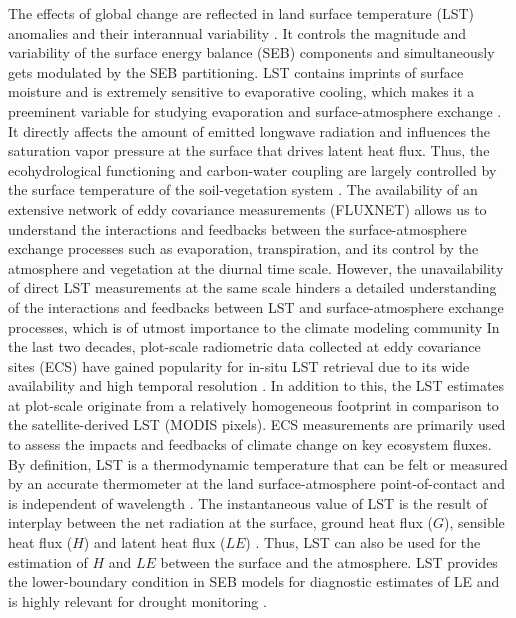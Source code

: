 \documentclass[fleqn,10pt]{wlscirep}
\begin{document}
The effects of global change are reflected in land surface temperature (LST) anomalies and their interannual variability \cite{rowell2005scenario}. It controls the magnitude and variability of the surface energy balance (SEB) components and simultaneously gets modulated by the SEB partitioning\cite{mallick2015reintroducing,timmermans2007intercomparison}. LST contains imprints of surface moisture and is extremely sensitive to evaporative cooling, which makes it a preeminent variable for studying evaporation and surface-atmosphere exchange \cite{mallick2018critical,trebs2021role,kustas2009advances}. It directly affects the amount of emitted longwave radiation and influences the saturation vapor pressure at the surface that drives latent heat flux. Thus, the ecohydrological functioning and carbon-water coupling are largely controlled by the surface temperature of the soil-vegetation system \cite{still2021imaging}.
 The availability of an extensive network of eddy covariance measurements (FLUXNET) allows us to understand the interactions and feedbacks between the surface-atmosphere exchange processes such as evaporation, transpiration, and its control by the atmosphere and vegetation at the diurnal time scale. However, the unavailability of direct LST measurements at the same scale hinders a detailed understanding of the interactions and feedbacks between LST and surface-atmosphere exchange processes, which is of utmost importance to the climate modeling community \cite{migliavacca2021three} 
 In the last two decades, plot-scale radiometric data collected at eddy covariance sites (ECS) have gained popularity for in-situ LST retrieval due to its wide availability and high temporal resolution \cite{stoy2013data,cullen2007energy}. In addition to this, the LST estimates at plot-scale originate from a relatively homogeneous footprint in comparison to the satellite-derived LST (MODIS pixels). ECS measurements are primarily used to assess the impacts and feedbacks of climate change on key ecosystem fluxes\cite{baldocchi2001fluxnet}. 
 By definition, LST is a thermodynamic temperature that can be felt or measured by an accurate thermometer at the land surface-atmosphere point-of-contact and is independent of wavelength \cite{guillevic2017land}. The instantaneous value of LST is the result of interplay between the net radiation at the surface, ground heat flux ($G$), sensible heat flux ($H$) and latent heat flux ($LE$) \cite{wang_global_2013-2}. Thus, LST can also be used for the estimation of $H$ \cite{sun1995relationship} and $LE$ \cite{jacob2001comprehensive} between the surface and the atmosphere. LST provides the lower-boundary condition in SEB models for diagnostic estimates of LE  and is highly relevant for drought monitoring \cite{trebs2021role,mallick2016canopy,mallick2015reintroducing}. 
\end{document}
